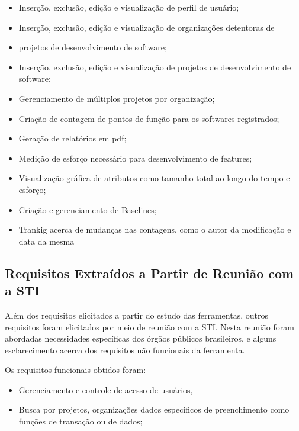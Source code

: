 \begin{itemize}

\item Inserção, exclusão, edição e visualização de perfil de usuário;

\item Inserção, exclusão, edição e visualização de organizações detentoras de

\item projetos de desenvolvimento de software;

\item Inserção, exclusão, edição e visualização de projetos de desenvolvimento de software;

\item Gerenciamento de múltiplos projetos por organização;

\item Criação de contagem de pontos de função para os softwares registrados;

\item Geração de relatórios em pdf;

\item Medição de esforço necessário para desenvolvimento de features;

\item Visualização gráfica de atributos como tamanho total ao longo do tempo e
esforço;

\item Criação e gerenciamento de Baselines;

\item Trankig acerca de mudanças nas contagens, como o autor da modificação e data da mesma

\end{itemize}

\subsection{Requisitos Extraídos a Partir de Reunião com a STI}

Além dos requisitos elicitados a partir do estudo das ferramentas, outros requisitos foram elicitados por meio de reunião com a STI. Nesta reunião foram abordadas necessidades específicas dos órgãos públicos brasileiros, e alguns esclarecimento acerca dos requisitos não funcionais da ferramenta.

Os requisitos funcionais obtidos foram:

\begin{itemize}

  \item Gerenciamento e controle de acesso de usuários,

  \item Busca por projetos, organizações  dados específicos de preenchimento
  como funções de transação ou de dados;

\end{itemize}

